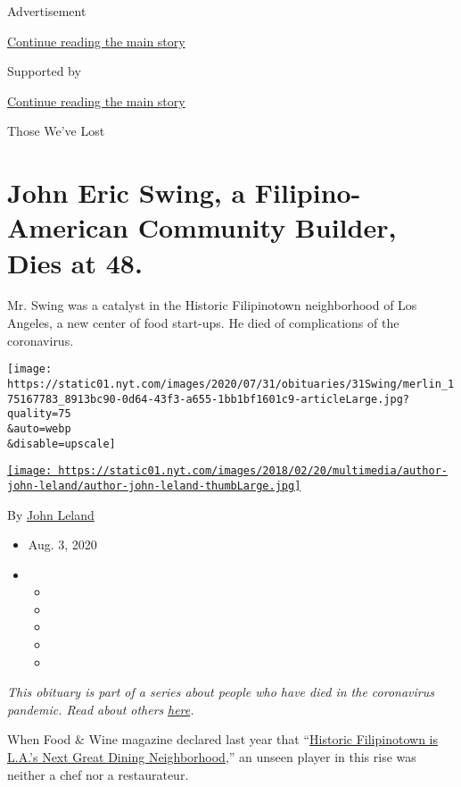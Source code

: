 Advertisement

\protect\hyperlink{after-top}{Continue reading the main story}

Supported by

\protect\hyperlink{after-sponsor}{Continue reading the main story}

Those We've Lost

\hypertarget{john-eric-swing-a-filipino-american-community-builder-dies-at-48}{%
\section{John Eric Swing, a Filipino-American Community Builder, Dies at
48.}\label{john-eric-swing-a-filipino-american-community-builder-dies-at-48}}

Mr. Swing was a catalyst in the Historic Filipinotown neighborhood of
Los Angeles, a new center of food start-ups. He died of complications of
the coronavirus.

\texttt{[image: https://static01.nyt.com/images/2020/07/31/obituaries/31Swing/merlin\_175167783\_8913bc90-0d64-43f3-a655-1bb1bf1601c9-articleLarge.jpg?quality=75\\\&auto=webp\\\&disable=upscale]}

\href{https://www.nytimes.com/by/john-leland}{\texttt{[image: https://static01.nyt.com/images/2018/02/20/multimedia/author-john-leland/author-john-leland-thumbLarge.jpg]}}

By \href{https://www.nytimes.com/by/john-leland}{John Leland}

\begin{itemize}
\item
  Aug. 3, 2020
\item
  \begin{itemize}
  \item
  \item
  \item
  \item
  \item
  \end{itemize}
\end{itemize}

\emph{This obituary is part of a series about people who have died in
the coronavirus pandemic. Read about others}
\href{https://www.nytimes.com/interactive/2020/obituaries/people-died-coronavirus-obituaries.html}{\emph{here}}\emph{.}

When Food \& Wine magazine declared last year that
``\href{https://www.foodandwine.com/travel/restaurants/historic-filipinotown-restaurants-los-angeles}{Historic
Filipinotown is L.A.'s Next Great Dining Neighborhood},'' an unseen
player in this rise was neither a chef nor a restaurateur.

